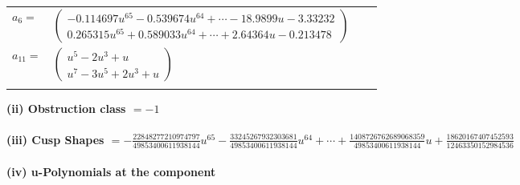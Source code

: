 \documentclass[1p]{elsarticle_modified}
\theoremstyle{definition}
\begin{document}
\begin{tabular}{m{7pt} m{180pt} m{7pt} m{180pt} }
\flushright $a_{6}=$&$\begin{pmatrix}-0.114697 u^{65}-0.539674 u^{64}+\cdots-18.9899 u-3.33232\\0.265315 u^{65}+0.589033 u^{64}+\cdots+2.64364 u-0.213478\end{pmatrix}$ \\
\flushright $a_{11}=$&$\begin{pmatrix}u^5-2 u^3+u\\u^7-3 u^5+2 u^3+u\end{pmatrix}$\\&\end{tabular}
\flushleft \textbf{(ii) Obstruction class $= -1$}\\~\\
\flushleft \textbf{(iii) Cusp Shapes $= -\frac{22848277210974797}{49853400611938144} u^{65}-\frac{33245267932303681}{49853400611938144} u^{64}+\cdots+\frac{1408726762689068359}{49853400611938144} u+\frac{18620167407452593}{12463350152984536}$}\\~\\
\newpage\renewcommand{\arraystretch}{1}
\flushleft \textbf{(iv) u-Polynomials at the component}\newline \\
\end{document}
